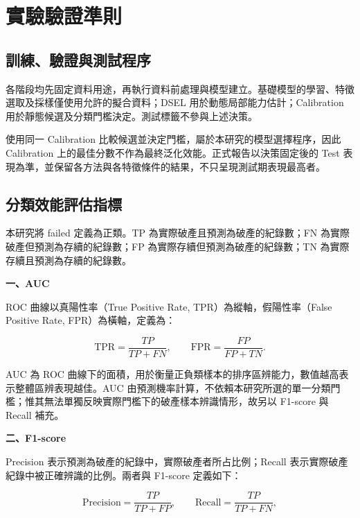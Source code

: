 \section{實驗驗證準則}\label{sec:method-validation}

\subsection{訓練、驗證與測試程序}

各階段均先固定資料用途，再執行資料前處理與模型建立。基礎模型的學習、特徵選取及採樣僅使用允許的擬合資料；DSEL 用於動態局部能力估計；Calibration 用於靜態候選及分類門檻決定。測試標籤不參與上述決策。

使用同一 Calibration 比較候選並決定門檻，屬於本研究的模型選擇程序，因此 Calibration 上的最佳分數不作為最終泛化效能。正式報告以決策固定後的 Test 表現為準，並保留各方法與各特徵條件的結果，不只呈現測試期表現最高者。

\subsection{分類效能評估指標}

本研究將 failed 定義為正類。TP 為實際破產且預測為破產的紀錄數；FN 為實際破產但預測為存續的紀錄數；FP 為實際存續但預測為破產的紀錄數；TN 為實際存續且預測為存續的紀錄數。

\textbf{一、AUC}

ROC 曲線以真陽性率（True Positive Rate, TPR）為縱軸，假陽性率（False Positive Rate, FPR）為橫軸，定義為：

\begin{equation}\label{eq:method-roc}
\mathrm{TPR}=\frac{TP}{TP+FN},\qquad
\mathrm{FPR}=\frac{FP}{FP+TN}.
\end{equation}

AUC 為 ROC 曲線下的面積，用於衡量正負類樣本的排序區辨能力，數值越高表示整體區辨表現越佳。AUC 由預測機率計算，不依賴本研究所選的單一分類門檻；惟其無法單獨反映實際門檻下的破產樣本辨識情形，故另以 F1-score 與 Recall 補充。

\textbf{二、F1-score}

Precision 表示預測為破產的紀錄中，實際破產者所占比例；Recall 表示實際破產紀錄中被正確辨識的比例。兩者與 F1-score 定義如下：

\begin{equation}\label{eq:recall}
\mathrm{Precision}=\frac{TP}{TP+FP},\qquad
\mathrm{Recall}=\frac{TP}{TP+FN},
\end{equation}


